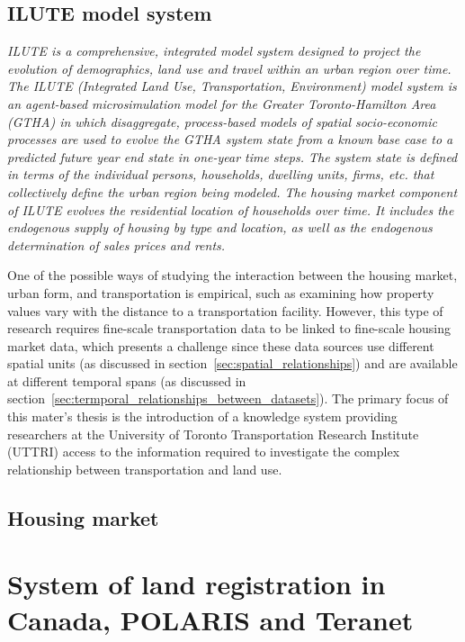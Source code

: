 \subsection{ILUTE model system} \label{subsec:ilute}

\textit{ILUTE is a comprehensive, integrated model system designed to project the evolution of demographics, land use and travel within an urban region over time.
The ILUTE (Integrated Land Use, Transportation, Environment) model system is an agent-based microsimulation model for the Greater Toronto-Hamilton Area (GTHA) in which disaggregate, process-based models of spatial socio-economic processes are used to evolve the GTHA system state from a known base case to a predicted future year end state in one-year time steps.
The system state is defined in terms of the individual persons, households, dwelling units, firms, etc.
that collectively define the urban region being modeled.
The housing market component of ILUTE evolves the residential location of households over time.
It includes the endogenous supply of housing by type and location, as well as the endogenous determination of sales prices and rents.}\cite{Miller2010}

One of the possible ways of studying the interaction between the housing market, urban form, and transportation is empirical, such as examining how property values vary with the distance to a transportation facility\cite{Sherry1999}.
However, this type of research requires fine-scale transportation data to be linked to fine-scale housing market data, which presents a challenge since these data sources use different spatial units (as discussed in section~\ref{sec:spatial_relationships}) and are available at different temporal spans (as discussed in section~\ref{sec:termporal_relationships_between_datasets}).
The primary focus of this mater's thesis is the introduction of a knowledge system providing researchers at the University of Toronto Transportation Research Institute (UTTRI) access to the information required to investigate the complex relationship between transportation and land use.

\subsection{Housing market} \label{subsec:housing_market}



\section{System of land registration in Canada, POLARIS and Teranet} \label{sec:system_of_land_registration_polaris_teranet}

